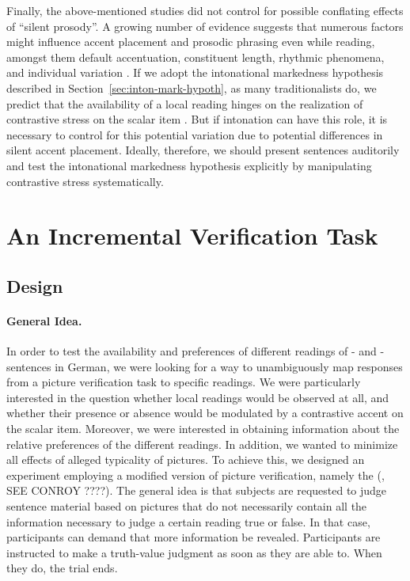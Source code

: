 \documentclass[fleqn,reqno,10pt,draft]{article}
\newcommand{\as}{\acro{as}}
\renewcommand{\es}{\acro{es}}
\begin{document}
Finally, the above-mentioned studies did not control for possible
conflating effects of ``silent prosody''. A growing number of evidence
suggests that numerous factors might influence accent placement and
prosodic phrasing even while reading, amongst them default
accentuation, constituent length, rhythmic phenomena, and individual
variation \citep[e.g.][]{Augurzky08,Bader98,Fodor98,Fodor02,Kentner12,
  Steinhauer01}. If we adopt the intonational markedness hypothesis
described in Section~\ref{sec:inton-mark-hypoth}, as many
traditionalists do, we predict that the availability of a local
reading hinges on the realization of contrastive stress on the scalar
item
\citep[e.g.][]{Horn2006:The-Border-Wars,Geurts2009:Scalar-Implicat,Geurts2010:Quantity-Implic,Tielvan-Tiel2012:Embedded-Scalar,GeurtsTielvan-Tiel2013:Scalar-expressi}.
But if intonation can have this role, it is necessary to control for
this potential variation due to potential differences in silent accent
placement. Ideally, therefore, we should present sentences auditorily
and test the intonational markedness hypothesis explicitly by
manipulating contrastive stress systematically.


\section{An Incremental Verification Task}
\label{sec:exp}

\subsection{Design}
\label{sec:design}

\paragraph{General Idea.} In order to test the availability and
preferences of different readings of \as- and \es-sentences in German, 
we were looking for a way to unambiguously map responses from a picture
verification task to specific readings. We were particularly
interested in the question whether local readings would be observed at
all, and whether their presence or absence would be modulated by
a contrastive accent on the scalar item. Moreover, we were  
interested in obtaining information about the relative preferences 
of the different readings. In addition, we wanted
to minimize all effects of alleged typicality of pictures. To achieve this, we designed an experiment employing a
modified version of picture verification, namely the
 (, SEE CONROY
????). The general idea is that subjects are requested to judge
sentence material based on pictures that do not necessarily contain
all the information necessary to judge a certain reading true or
false. In that case, participants can demand that more information be
revealed. Participants are instructed to make a truth-value judgment
as soon as they are able to. When they do, the trial ends.
\end{document}
